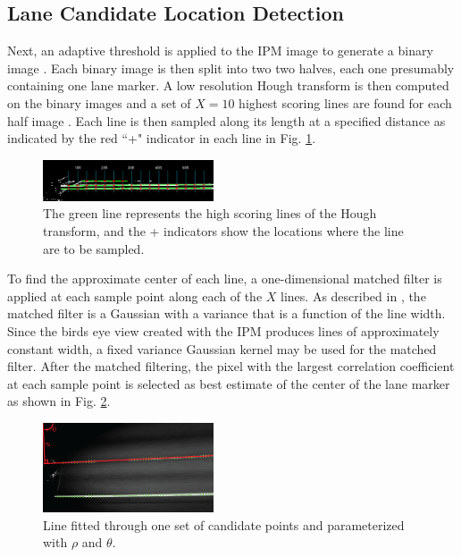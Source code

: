 \documentclass{article}
\begin{document}
\subsection{Lane Candidate Location Detection}
Next, an adaptive threshold is applied to the IPM image to generate a binary image \cite{borkar_layered_2009}. Each binary image is then split into two two halves, each one presumably containing one lane marker.
A low resolution Hough transform is then computed on the binary images and a set of $X=10$ highest scoring lines are found for each half image \cite{borkar_layered_2009}. Each line is then sampled along its length at a specified distance as indicated by the red ``+" indicator in each line in Fig. \ref{fig:sampling_points}.
\begin{figure}[htb]
  \centering
  \includegraphics[width=0.45\textwidth]{IMG/cand_lane_points.png}
  \caption{The green line represents the high scoring lines of the Hough transform, and the + indicators show the locations where the line are to be sampled.}
  \label{fig:sampling_points}
\end{figure}
To find the approximate center of each line, a one-dimensional matched filter is applied at each sample point along each of the $X$ lines.
As described in \cite{borkar_layered_2009}, the matched filter is a Gaussian with a variance that is a function of the line width.
Since the birds eye view created with the IPM produces lines of approximately constant width, a fixed variance Gaussian kernel may be used for the matched filter.
After the matched filtering, the pixel with the largest correlation coefficient at each sample point is selected as best estimate of the center of the lane marker as shown in Fig. \ref{fig:cand_pts}.
\begin{figure}[htb]
  \centering
  \includegraphics[width=0.45\textwidth]{IMG/rho_theta.png}
  \caption{Line fitted through one set of candidate points and parameterized with $\rho$ and $\theta$.}
  \label{fig:cand_pts}
\end{figure}
\end{document}
